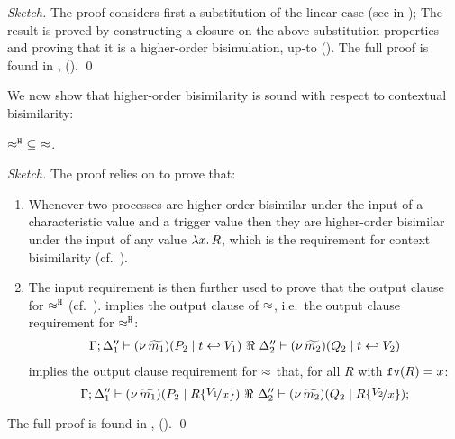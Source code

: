 \begin{proof}[Sketch]
	The proof considers first a substitution of the linear
	case (see  in );
	The result is proved by constructing a closure on the above
	substitution properties and proving that it is a
	higher-order bisimulation, up-to \betatran ().
	The full proof is found in , 
	 ().
	\qed
\end{proof}

We now show that higher-order bisimilarity is sound with respect to contextual bisimilarity:

\begin{lemma}
	\label{lem:wb_is_wbc}
	$\approx^\mathtt{H}\ \subseteq\ \approx$.
\end{lemma}

\begin{proof}[Sketch]
	The proof relies on  to prove that:
	\begin{enumerate}
		\item	Whenever two processes are higher-order bisimilar
				under the input of
				a characteristic value and a trigger value
				then they are higher-order bisimilar under the
				input of any value $\lambda x.\,R$, which is the
				requirement for context bisimilarity (cf.~).

		\item	The input requirement is then further used
				to prove that the output clause for $\approx^\mathtt{H}$ (cf.~).
				implies the output clause of $\approx$,
				i.e.~the output clause requirement for $\approx^\mathtt{H}$:
				\[
					\begin{array}{lrlll}
						\Gamma; \Delta''_1  \proves  {\newsp{\widetilde{m_1}}{P_2 \Par \htrigger{t}{V_1}}}
						\ \Re\ 
						\Delta''_2 \proves {\newsp{\widetilde{m_2}}{Q_2 \Par \htrigger{t}{V_2}}}
					\end{array}
				\]
				implies the output clause requirement for $\approx$ that,
				for all $R$ with $\mathtt{fv}(R)=x$:
				\[
					\horel{\Gamma}{\Delta_1''}{\newsp{\widetilde{m_1}}{P_2 \Par R\subst{V_1}{x}}}
					{\ \Re\ }
					{\Delta_2''}{\newsp{\widetilde{m_2}}{Q_2 \Par R\subst{V_2}{x}}};
				\]
	\end{enumerate}
%
	The full proof is found  in , 
	 ().
	\qed
\end{proof}

